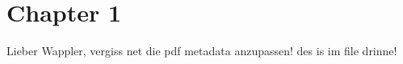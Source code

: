 \chapter{Chapter 1}
Lieber Wappler, vergiss net die pdf metadata anzupassen! des is im  file drinne!